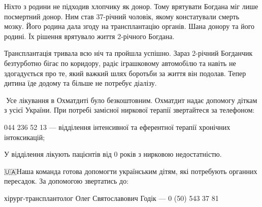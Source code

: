 Ніхто з родини не підходив хлопчику як донор. Тому врятувати Богдана міг лише
посмертний донор. Ним став 37-річний чоловік, якому констатували смерть мозку.
Його родина дала згоду на трансплантацію органів. Шана донору та його родині.
Їх рішення врятувало життя 2-річного Богдана.🙏🏻

Трансплантація тривала всю ніч та пройшла успішно. Зараз 2-річний Богданчик
безтурботно бігає по коридору, радіє іграшковому автомобілю та навіть не
здогадується про те, який важкий шлях боротьби за життя він подолав. Тепер
дитина їде додому та більше не потребує діалізу.💛

🔻Усе лікування в Охматдиті було безкоштовним. Охматдит надає допомогу діткам з
усієї України. При потребі замісної ниркової терапії звертайтеся за телефоном:

044 236 52 13 — відділення інтенсивної та еферентної терапії хронічних
інтоксикацій;

У відділення лікують пацієнтів від 0 років з нирковою недостатністю.

🇺🇦Наша команда готова допомогти українським дітям, які потребують органних
пересадок. За допомогою звертатись до:

хірург-трансплантолог Олег Святославович Годік — 0 (50) 543 37 81


